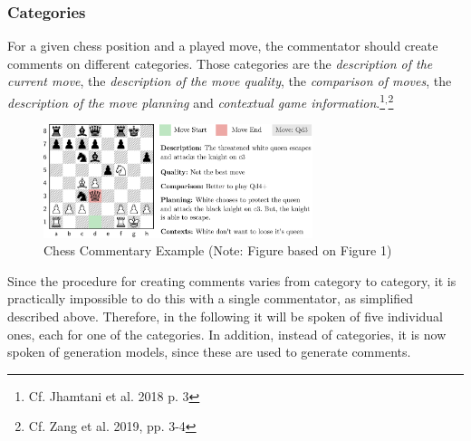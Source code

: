 \subsubsection{Categories}

For a given chess position and a played move, the commentator should create comments on different categories. Those categories are the \textit{description of the current move}, the \textit{description of the move quality}, the \textit{comparison of moves}, the \textit{description of the move planning} and \textit{contextual game information}.\footnote{Cf. Jhamtani et al. 2018 p. 3}$^{,}$\footnote{Cf. Zang et al. 2019, pp. 3-4}

\begin{figure}[h]
\centering
\includegraphics[width=0.7\textwidth]{graphics/commentator_example/commentator.png}
\caption{Chess Commentary Example (Note: Figure based on \cite{zang-etal-2019-automated} Figure 1)}
\end{figure}

Since the procedure for creating comments varies from category to category, it is practically impossible to do this with a single commentator, as simplified described above. Therefore, in the following it will be spoken of five individual ones, each for one of the categories. In addition, instead of categories, it is now spoken of generation models, since these are used to generate comments.

